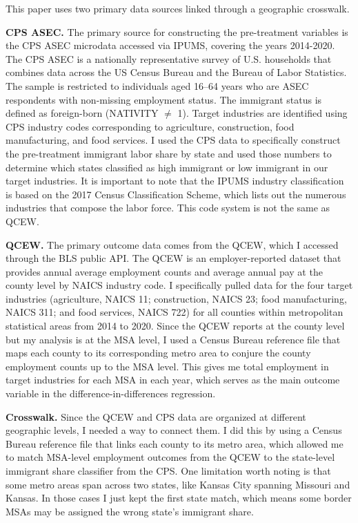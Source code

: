 \documentclass[12pt]{article}
\begin{document}
This paper uses two primary data sources linked through a geographic
crosswalk.
 
\textbf{CPS ASEC.} The primary source for constructing the pre-treatment variables is the CPS ASEC microdata accessed via IPUMS, covering the years 2014-2020. The CPS ASEC is a nationally representative survey of U.S. households that combines data across the US Census Bureau and the Bureau of Labor Statistics. The sample is restricted to individuals
aged 16--64 years who are ASEC respondents with non-missing employment status. The immigrant status is defined as foreign-born (NATIVITY $\neq$ 1). Target industries are identified using CPS industry codes corresponding to agriculture, construction, food manufacturing, and food services. I used the CPS data to specifically construct the pre-treatment immigrant labor share by state and used those numbers to determine which states classified as high immigrant or low immigrant in our target industries. It is important to note that the IPUMS industry classification is based on the 2017 Census Classification Scheme, which lists out the numerous industries that compose the labor force. This code system is not the same as QCEW. 
 
\textbf{QCEW.} The primary outcome data comes from the QCEW, which I accessed through the BLS public API. The QCEW is an employer-reported dataset that provides annual average employment counts and average annual pay at the county level by NAICS industry code. I specifically pulled data for the four target industries (agriculture, NAICS 11; construction, NAICS 23; food manufacturing, NAICS 311; and food services, NAICS 722) for all counties within metropolitan statistical areas from 2014 to 2020. Since the QCEW reports at the county level but my analysis is at the MSA level, I used a Census Bureau reference file that maps each county to its corresponding metro area to conjure the county employment counts up to the MSA level. This gives me total employment in target industries for each MSA in each year, which serves as the main outcome variable in the difference-in-differences regression.
 
\textbf{Crosswalk.} Since the QCEW and CPS data are organized at different geographic levels, I needed a way to connect them. I did this by using a Census Bureau reference file that links each county to its metro area, which allowed me to match MSA-level employment outcomes from the QCEW to the state-level immigrant share classifier from the CPS. One limitation worth noting is that some metro areas span across two states, like Kansas City spanning Missouri and Kansas. In those cases I just kept the first state match, which means some border MSAs may be assigned the wrong state's immigrant share.
 
\end{document}
